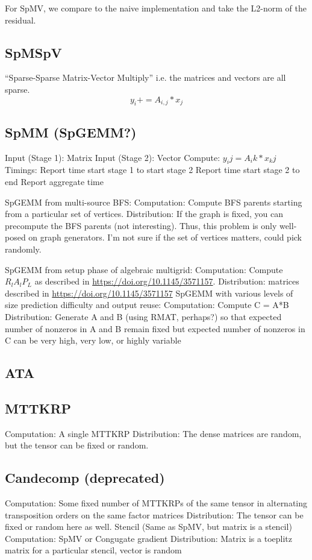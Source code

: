 For SpMV, we compare to the naive implementation and take the L2-norm of the residual. 




\subsection{SpMSpV}
``Sparse-Sparse Matrix-Vector Multiply'' i.e. the matrices and vectors are all sparse.
$$y_i += A_{i,j} * x_j$$

\subsection{SpMM (SpGEMM?)}
	Input (Stage 1):
		Matrix
	Input (Stage 2):
		Vector
	Compute:
		$y_ij = A_ik * x_kj$
	Timings:
Report time start stage 1 to start stage 2
Report time start stage 2 to end
Report aggregate time

SpGEMM from multi-source BFS:
	Computation: Compute BFS parents starting from a particular set of vertices.
	Distribution: If the graph is fixed, you can precompute the BFS parents (not interesting). Thus, this problem is only well-posed on graph generators. I’m not sure if the set of vertices matters, could pick randomly.

SpGEMM from setup phase of algebraic multigrid:
	Computation: Compute $R_lA_lP_L$ as described in \url{https://doi.org/10.1145/3571157}.
	Distribution: matrices described in \url{https://doi.org/10.1145/3571157}
SpGEMM with various levels of size prediction difficulty and output reuse:
	Computation: Compute C = A*B
	Distribution: Generate A and B (using RMAT, perhaps?) so that expected number of nonzeros in A and B remain fixed but expected number of nonzeros in C can be very high, very low, or highly variable

\subsection{ATA}

\subsection{MTTKRP}
	Computation: A single MTTKRP 
	Distribution: The dense matrices are random, but the tensor can be fixed or random.


\subsection{Candecomp (deprecated)}
	Computation: Some fixed number of MTTKRPs of the same tensor in alternating transposition orders on the same factor matrices
	Distribution: The tensor can be fixed or random here as well.
Stencil (Same as SpMV, but matrix is a stencil)
	Computation: SpMV or Congugate gradient
	Distribution: Matrix is a toeplitz matrix for a particular stencil, vector is random

